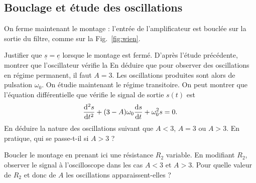 \subsection{Bouclage et étude des oscillations}
On ferme maintenant le montage : l'entrée de l'amplificateur est bouclée sur la sortie du filtre, comme sur la Fig.~\ref{fig:wien}.
\begin{protocole}
\todo Justifier que $\underline{s} = \underline{e}$ lorsque le montage est fermé. D'après l'étude précédente, montrer que l'oscillateur vérifie la 
En déduire que pour observer des oscillations en régime permanent, il faut $A=3$. Les oscillations produites  sont alors de pulsation $\omega_0$.
\todo On étudie maintenant le régime transitoire. On peut montrer que l'équation différentielle que vérifie le signal de sortie $s(t)$ est
\begin{equation}
\frac{\mathrm{d}^2 s}{\mathrm{d} t^2} + (3-A)\omega_0 \frac{\mathrm{d} s}{\mathrm{d} t}+\omega_0^2 s = 0.
\end{equation}
En déduire la nature des oscillations suivant que $A<3$, $A=3$ ou $A>3$. En pratique, qui se passe-t-il si $A>3$ ?
\item Boucler le montage en prenant ici une résistance $R_2$ variable. En modifiant $R_2$, observer le signal à l’oscilloscope dans les cas $A<3$ et $A>3$. Pour quelle valeur de $R_2$ et donc de $A$ les oscillations apparaissent-elles ?
\end{protocole}
